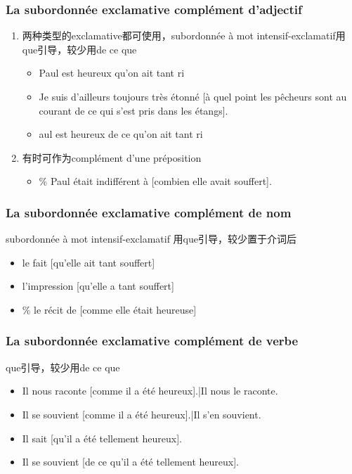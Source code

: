\documentclass[UTF8]{report}
\begin{document}
\subsubsection{La subordonnée exclamative complément d’adjectif}
\begin{enumerate}
    \item 两种类型的exclamative都可使用，subordonnée à mot intensif-exclamatif用que引导，较少用de ce que
    \begin{itemize}
        \item Paul est heureux qu’on ait tant ri
        \item Je suis d’ailleurs toujours très étonné [à quel point les pêcheurs sont au courant de ce qui s’est pris dans les étangs].
        \item aul est heureux de ce qu’on ait tant ri
    \end{itemize}
    \item 有时可作为complément d’une préposition
    \begin{itemize}
        \item \% Paul était indifférent à [combien elle avait souffert].
    \end{itemize}
\end{enumerate}

\subsubsection{ La subordonnée exclamative complément de nom}
subordonnée à mot intensif-exclamatif 用que引导，较少置于介词后
\begin{itemize}
    \item le fait [qu’elle ait tant souffert]
    \item l’impression [qu’elle a tant souffert]
    \item \% le récit de [comme elle était heureuse]
\end{itemize}

\subsubsection{La subordonnée exclamative complément de verbe}
que引导，较少用de ce que
\begin{itemize}
    \item Il nous raconte [comme il a été heureux].|Il nous le raconte.
    \item Il se souvient [comme il a été heureux].|Il s’en souvient.
    \item Il sait [qu’il a été tellement heureux].
    \item Il se souvient [de ce qu’il a été tellement heureux].
\end{itemize}
\end{document}

